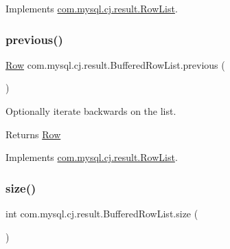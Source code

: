 Implements \mbox{\hyperlink{interfacecom_1_1mysql_1_1cj_1_1result_1_1_row_list_a403554a1f4945bd623ed3b7489674a2e}{com.\+mysql.\+cj.\+result.\+Row\+List}}.

\mbox{\label{classcom_1_1mysql_1_1cj_1_1result_1_1_buffered_row_list_a899cd7f256715f653cb2faa2d8026491}} 
\subsubsection{\texorpdfstring{previous()}{previous()}}
{\footnotesize\ttfamily \mbox{\hyperlink{interfacecom_1_1mysql_1_1cj_1_1result_1_1_row}{Row}} com.\+mysql.\+cj.\+result.\+Buffered\+Row\+List.\+previous (\begin{DoxyParamCaption}{ }\end{DoxyParamCaption})}

Optionally iterate backwards on the list.

\begin{DoxyReturn}{Returns}
\mbox{\hyperlink{interfacecom_1_1mysql_1_1cj_1_1result_1_1_row}{Row}} 
\end{DoxyReturn}


Implements \mbox{\hyperlink{interfacecom_1_1mysql_1_1cj_1_1result_1_1_row_list_a8fcbee0be0e6e13ee3862c46ec7e8e39}{com.\+mysql.\+cj.\+result.\+Row\+List}}.

\mbox{\label{classcom_1_1mysql_1_1cj_1_1result_1_1_buffered_row_list_a237ee911857a3afeb8641811508bb5b9}} 
\subsubsection{\texorpdfstring{size()}{size()}}
{\footnotesize\ttfamily int com.\+mysql.\+cj.\+result.\+Buffered\+Row\+List.\+size (\begin{DoxyParamCaption}{ }\end{DoxyParamCaption})}

